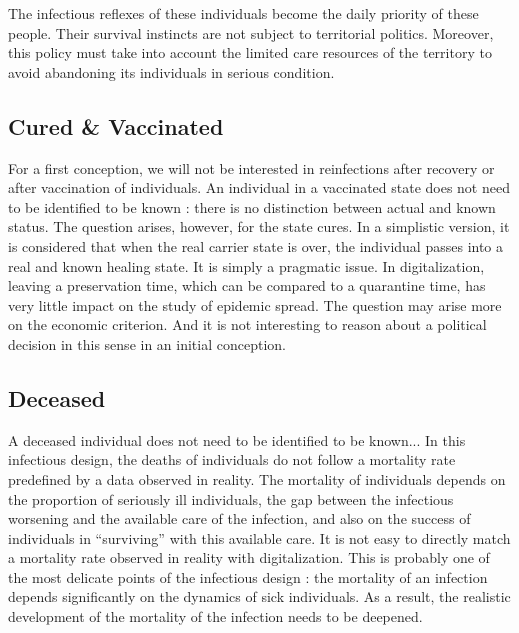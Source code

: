 The infectious reflexes of these individuals become the daily priority of these people. Their survival instincts are not subject to territorial politics. Moreover, this policy must take into account the limited care resources of the territory to avoid abandoning its individuals in serious condition.\\

\subsection{Cured \& Vaccinated}

For a first conception, we will not be interested in reinfections after recovery or after vaccination of individuals. An individual in a vaccinated state does not need to be identified to be known : there is no distinction between actual and known status. The question arises, however, for the state cures. In a simplistic version, it is considered that when the real carrier state is over, the individual passes into a real and known healing state. It is simply a pragmatic issue. In digitalization, leaving a preservation time, which can be compared to a quarantine time, has very little impact on the study of epidemic spread. The question may arise more on the economic criterion. And it is not interesting to reason about a political decision in this sense in an initial conception.\\

\subsection{Deceased}

A deceased individual does not need to be identified to be known... In this infectious design, the deaths of individuals do not follow a mortality rate predefined by a data observed in reality. The mortality of individuals depends on the proportion of seriously ill individuals, the gap between the infectious worsening and the available care of the infection, and also on the success of individuals in ``surviving'' with this available care. It is not easy to directly match a mortality rate observed in reality with digitalization. This is probably one of the most delicate points of the infectious design : the mortality of an infection depends significantly on the dynamics of sick individuals. As a result, the realistic development of the mortality of the infection needs to be deepened.\\

\newpage

